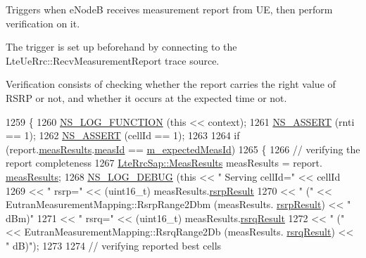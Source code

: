 Triggers when e\+NodeB receives measurement report from UE, then perform verification on it. 

The trigger is set up beforehand by connecting to the {\ttfamily Lte\+Ue\+Rrc\+::\+Recv\+Measurement\+Report} trace source.

Verification consists of checking whether the report carries the right value of R\+S\+RP or not, and whether it occurs at the expected time or not. 
\begin{DoxyCode}
1259 \{
1260   \hyperlink{log-macros-disabled_8h_a90b90d5bad1f39cb1b64923ea94c0761}{NS\_LOG\_FUNCTION} (\textcolor{keyword}{this} << context);
1261   \hyperlink{assert_8h_a6dccdb0de9b252f60088ce281c49d052}{NS\_ASSERT} (rnti == 1);
1262   \hyperlink{assert_8h_a6dccdb0de9b252f60088ce281c49d052}{NS\_ASSERT} (cellId == 1);
1263 
1264   \textcolor{keywordflow}{if} (report.\hyperlink{structns3_1_1LteRrcSap_1_1MeasurementReport_a84a65ffec25d719fdcba03fb28ca5b86}{measResults}.\hyperlink{structns3_1_1LteRrcSap_1_1MeasResults_a1608bbea7e59da137c1b58d3bf55e907}{measId} == \hyperlink{classLteUeMeasurementsPiecewiseTestCase2_af0d0ce23466c65b4ded17e0d8a5748bd}{m\_expectedMeasId})
1265     \{
1266       \textcolor{comment}{// verifying the report completeness}
1267       \hyperlink{structns3_1_1LteRrcSap_1_1MeasResults}{LteRrcSap::MeasResults} measResults = report.
      \hyperlink{structns3_1_1LteRrcSap_1_1MeasurementReport_a84a65ffec25d719fdcba03fb28ca5b86}{measResults};
1268       \hyperlink{group__logging_ga413f1886406d49f59a6a0a89b77b4d0a}{NS\_LOG\_DEBUG} (\textcolor{keyword}{this} << \textcolor{stringliteral}{" Serving cellId="} << cellId
1269                          << \textcolor{stringliteral}{" rsrp="} << (uint16\_t) measResults.\hyperlink{structns3_1_1LteRrcSap_1_1MeasResults_a4d7bf8765525493fe5f5cccdbf94ab8b}{rsrpResult}
1270                          << \textcolor{stringliteral}{" ("} << EutranMeasurementMapping::RsrpRange2Dbm (measResults.
      \hyperlink{structns3_1_1LteRrcSap_1_1MeasResults_a4d7bf8765525493fe5f5cccdbf94ab8b}{rsrpResult}) << \textcolor{stringliteral}{" dBm)"}
1271                          << \textcolor{stringliteral}{" rsrq="} << (uint16\_t) measResults.\hyperlink{structns3_1_1LteRrcSap_1_1MeasResults_a6a64246cfa5d09eb42120890de3dca32}{rsrqResult}
1272                          << \textcolor{stringliteral}{" ("} << EutranMeasurementMapping::RsrqRange2Db (measResults.
      \hyperlink{structns3_1_1LteRrcSap_1_1MeasResults_a6a64246cfa5d09eb42120890de3dca32}{rsrqResult}) << \textcolor{stringliteral}{" dB)"});
1273 
1274       \textcolor{comment}{// verifying reported best cells}

\end{DoxyCode}
